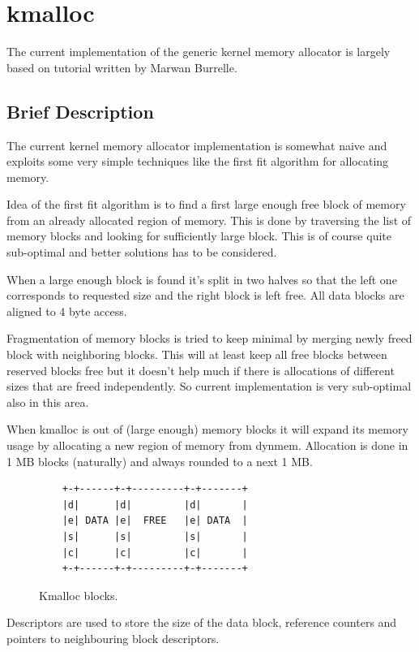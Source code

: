 \chapter{kmalloc}

The current implementation of the generic kernel memory allocator is largely
based on tutorial written by Marwan Burrelle\cite{Burelle:malloc}.

\section{Brief Description}

The current kernel memory allocator implementation is somewhat naive and
exploits some very simple techniques like the first fit algorithm for allocating
memory.

Idea of the first fit algorithm is to find a first large enough free block of
memory from an already allocated region of memory. This is done by traversing
the list of memory blocks and looking for sufficiently large block. This is
of course quite sub-optimal and better solutions has to be considered.

When a large enough block is found it's split in two halves so that the left
one corresponds to requested size and the right block is left free. All data
blocks are aligned to 4 byte access.

Fragmentation of memory blocks is tried to keep minimal by merging newly freed
block with neighboring blocks. This will at least keep all free blocks between
reserved blocks free but it doesn't help much if there is allocations of
different sizes that are freed independently. So current implementation is very
sub-optimal also in this area.

When kmalloc is out of (large enough) memory blocks it will expand its memory
usage by allocating a new region of memory from dynmem. Allocation is done in
1 MB blocks (naturally) and always rounded  to a next 1 MB.

\begin{figure}
\begin{verbatim}
    +-+------+-+---------+-+-------+
    |d|      |d|         |d|       |
    |e| DATA |e|  FREE   |e| DATA  |
    |s|      |s|         |s|       |
    |c|      |c|         |c|       |
    +-+------+-+---------+-+-------+
\end{verbatim}
\caption{Kmalloc blocks.}
\label{figure:kmalloc_blocks}
\end{figure}

Descriptors are used to store the size of the data block, reference counters and
pointers to neighbouring block descriptors.


